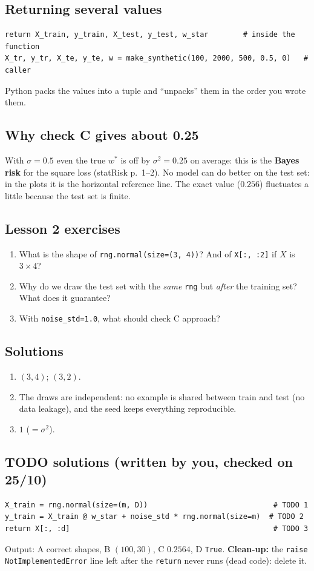 \documentclass[11pt,a4paper]{article}
\begin{document}
\subsection{Returning several values}
\begin{lstlisting}
return X_train, y_train, X_test, y_test, w_star        # inside the function
X_tr, y_tr, X_te, y_te, w = make_synthetic(100, 2000, 500, 0.5, 0)   # caller
\end{lstlisting}
Python packs the values into a tuple and ``unpacks'' them in the order you wrote them.

\subsection{Why check C gives about 0.25}
With $\sigma = 0.5$ even the true $w^*$ is off by $\sigma^2 = 0.25$ on average: this is the \textbf{Bayes risk}
for the square loss (statRisk p.~1--2). No model can do better on the test set: in the plots it is the horizontal reference line.
The exact value ($0.256$) fluctuates a little because the test set is finite.

\subsection*{Lesson 2 exercises}
\begin{enumerate}
  \item What is the shape of \texttt{rng.normal(size=(3, 4))}? And of \texttt{X[:, :2]} if $X$ is $3\times4$?
  \item Why do we draw the test set with the \emph{same} \texttt{rng} but \emph{after} the training set? What does it guarantee?
  \item With \texttt{noise\_std=1.0}, what should check C approach?
\end{enumerate}
\subsection*{Solutions}
\begin{enumerate}
  \item $(3,4)$; $(3,2)$.
  \item The draws are independent: no example is shared between train and test (no data leakage), and the seed keeps everything reproducible.
  \item $1$ ($=\sigma^2$).
\end{enumerate}
\subsection*{TODO solutions (written by you, checked on 25/10)}
\begin{lstlisting}
X_train = rng.normal(size=(m, D))                             # TODO 1
y_train = X_train @ w_star + noise_std * rng.normal(size=m)  # TODO 2
return X[:, :d]                                               # TODO 3
\end{lstlisting}
Output: A correct shapes, B $(100,30)$, C $0.2564$, D \texttt{True}.
\textbf{Clean-up:} the \texttt{raise NotImplementedError} line left after the \texttt{return} never runs (dead code): delete it.
\end{document}
